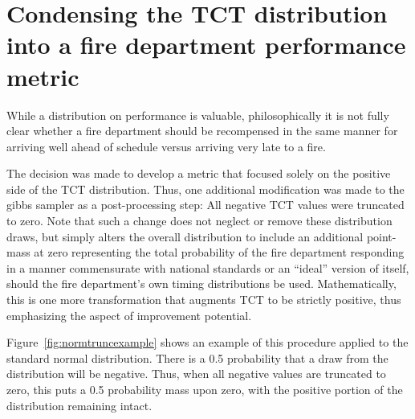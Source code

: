 \documentclass[12pt,oneside]{book}
\begin{document}
\section{Condensing the TCT distribution into a fire department performance metric}
While a distribution on performance is valuable, philosophically it is not fully clear whether a fire department should be recompensed in the same manner for arriving well ahead of schedule versus arriving very late to a fire.

The decision was made to develop a metric that focused solely on the positive side of the TCT distribution. Thus, one additional modification was made to the gibbs sampler as a post-processing step: All negative TCT values were truncated to zero. Note that such a change does not neglect or remove these distribution draws, but simply alters the overall distribution to include an additional point-mass at zero representing the total probability of the fire department responding in a manner commensurate with national standards or an ``ideal'' version of itself, should the fire department's own timing distributions be used. Mathematically, this is one more transformation that augments TCT to be strictly positive, thus emphasizing the aspect of improvement potential. 

Figure~\ref{fig:normtruncexample} shows an example of this procedure applied to the standard normal distribution. There is a 0.5 probability that a draw from the distribution will be negative. Thus, when all negative values are truncated to zero, this puts a 0.5 probability mass upon zero, with the positive portion of the distribution remaining intact.
\end{document}
